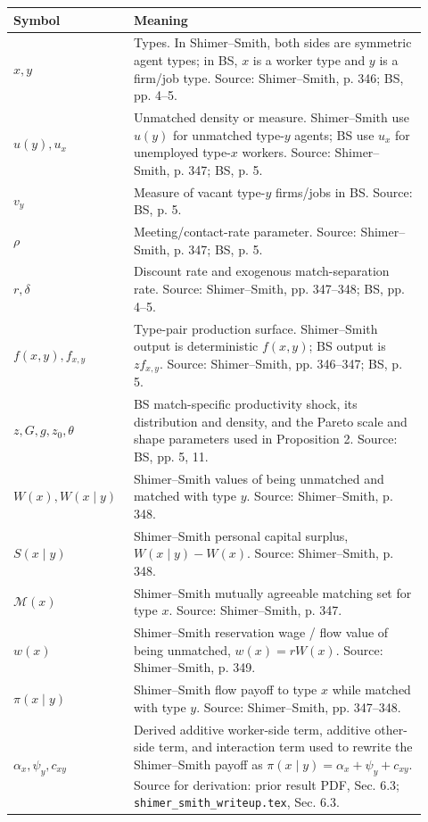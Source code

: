 \documentclass[11pt]{article}
\begin{document}
\begin{center}
\begin{tabular}{>{\raggedright\arraybackslash}p{0.24\linewidth}
                >{\raggedright\arraybackslash}p{0.68\linewidth}}
\toprule
Symbol & Meaning \\
\midrule
$x,y$ & Types. In Shimer--Smith, both sides are symmetric agent types; in BS, $x$ is a worker type and $y$ is a firm/job type. Source: Shimer--Smith, p. 346; BS, pp. 4--5. \\
$u(y),u_x$ & Unmatched density or measure. Shimer--Smith use $u(y)$ for unmatched type-$y$ agents; BS use $u_x$ for unemployed type-$x$ workers. Source: Shimer--Smith, p. 347; BS, p. 5. \\
$v_y$ & Measure of vacant type-$y$ firms/jobs in BS. Source: BS, p. 5. \\
$\rho$ & Meeting/contact-rate parameter. Source: Shimer--Smith, p. 347; BS, p. 5. \\
$r,\delta$ & Discount rate and exogenous match-separation rate. Source: Shimer--Smith, pp. 347--348; BS, pp. 4--5. \\
$f(x,y),f_{x,y}$ & Type-pair production surface. Shimer--Smith output is deterministic $f(x,y)$; BS output is $zf_{x,y}$. Source: Shimer--Smith, pp. 346--347; BS, p. 5. \\
$z,G,g,z_0,\theta$ & BS match-specific productivity shock, its distribution and density, and the Pareto scale and shape parameters used in Proposition 2. Source: BS, pp. 5, 11. \\
$W(x),W(x\mid y)$ & Shimer--Smith values of being unmatched and matched with type $y$. Source: Shimer--Smith, p. 348. \\
$S(x\mid y)$ & Shimer--Smith personal capital surplus, $W(x\mid y)-W(x)$. Source: Shimer--Smith, p. 348. \\
$\mathcal M(x)$ & Shimer--Smith mutually agreeable matching set for type $x$. Source: Shimer--Smith, p. 347. \\
$w(x)$ & Shimer--Smith reservation wage / flow value of being unmatched, $w(x)=rW(x)$. Source: Shimer--Smith, p. 349. \\
$\pi(x\mid y)$ & Shimer--Smith flow payoff to type $x$ while matched with type $y$. Source: Shimer--Smith, pp. 347--348. \\
$\alpha_x,\psi_y,c_{xy}$ & Derived additive worker-side term, additive other-side term, and interaction term used to rewrite the Shimer--Smith payoff as $\pi(x\mid y)=\alpha_x+\psi_y+c_{xy}$. Source for derivation: prior result PDF, Sec. 6.3; \texttt{shimer\_smith\_writeup.tex}, Sec. 6.3. \\

\end{tabular}
\end{center}
\end{document}
